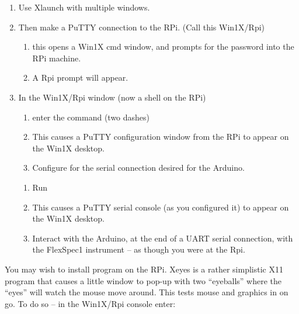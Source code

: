 \vspace{-.15cm}
\begin{enumerate}\addtolength{\itemsep}{-0.5\baselineskip}
   \item   Use Xlaunch with multiple windows.
   \item   Then make a PuTTY connection to the RPi. (Call this Win1X/Rpi)
\vspace{-.15cm}
\begin{enumerate}\addtolength{\itemsep}{-0.5\baselineskip}
   \item   this opens a Win1X cmd window, and prompts for the password into
 the RPi machine.
   \item   A Rpi prompt will appear.
\end{enumerate}

   \item   In the Win1X/Rpi window (now a shell on the RPi)
\vspace{-.15cm}
\begin{enumerate}\addtolength{\itemsep}{-0.5\baselineskip}
   \item   enter the command  (two dashes)
   \item   This causes a PuTTY configuration window from the RPi to appear on the 
           Win1X desktop.
   \item   Configure for the serial connection desired  for
          the Arduino.
\end{enumerate}

\vspace{-.15cm}
\begin{enumerate}\addtolength{\itemsep}{-0.5\baselineskip}
   \item   Run
   \item   This causes a PuTTY serial console (as you configured it) to appear on the
 Win1X desktop.
   \item   Interact with the Arduino, at the end of a UART serial connection, with
   the FlexSpec1 instrument -- as though you were at the Rpi.
\end{enumerate}
\end{enumerate}


You may wish to install  program on the RPi. Xeyes 
is a rather simplistic X11 program that causes a little window
to pop-up with two ``eyeballs'' where the ``eyes'' will watch the
mouse move around. This tests mouse and graphics in on go. To
do so -- in the Win1X/Rpi console enter: 

